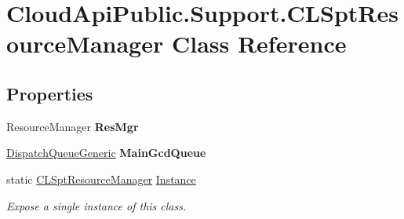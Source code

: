 \hypertarget{class_cloud_api_public_1_1_support_1_1_c_l_spt_resource_manager}{\section{Cloud\-Api\-Public.\-Support.\-C\-L\-Spt\-Resource\-Manager Class Reference}
\label{class_cloud_api_public_1_1_support_1_1_c_l_spt_resource_manager}
}
\subsection*{Properties}
\begin{DoxyCompactItemize}
\item 
\hypertarget{class_cloud_api_public_1_1_support_1_1_c_l_spt_resource_manager_a99b1dc4c3fdfac68aaadb2a53248e545}{Resource\-Manager {\bfseries Res\-Mgr}}\label{class_cloud_api_public_1_1_support_1_1_c_l_spt_resource_manager_a99b1dc4c3fdfac68aaadb2a53248e545}

\item 
\hypertarget{class_cloud_api_public_1_1_support_1_1_c_l_spt_resource_manager_ac7c7d4ced49775516e15b045705b961e}{\hyperlink{class_cloud_api_public_1_1_support_1_1_dispatch_queue_generic}{Dispatch\-Queue\-Generic} {\bfseries Main\-Gcd\-Queue}}\label{class_cloud_api_public_1_1_support_1_1_c_l_spt_resource_manager_ac7c7d4ced49775516e15b045705b961e}

\item 
static \hyperlink{class_cloud_api_public_1_1_support_1_1_c_l_spt_resource_manager}{C\-L\-Spt\-Resource\-Manager} \hyperlink{class_cloud_api_public_1_1_support_1_1_c_l_spt_resource_manager_a45c4cfa4a9690616ce783b9924731b4f}{Instance}
\begin{DoxyCompactList}\small\item\em Expose a single instance of this class. \end{DoxyCompactList}\end{DoxyCompactItemize}


